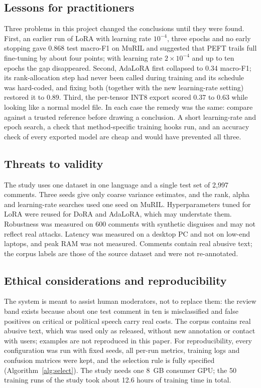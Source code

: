 \documentclass{svproc}
\begin{document}
\subsection{Lessons for practitioners}
Three problems in this project changed the conclusions until they were found. First, an earlier run of LoRA with learning rate $10^{-4}$, three epochs and no early stopping gave 0.868 test macro-F1 on MuRIL and suggested that PEFT trails full fine-tuning by about four points; with learning rate $2\times10^{-4}$ and up to ten epochs the gap disappeared. Second, AdaLoRA first collapsed to 0.34 macro-F1; its rank-allocation step had never been called during training and its schedule was hard-coded, and fixing both (together with the new learning-rate setting) restored it to 0.89. Third, the per-tensor INT8 export scored 0.37 to 0.63 while looking like a normal model file. In each case the remedy was the same: compare against a trusted reference before drawing a conclusion. A short learning-rate and epoch search, a check that method-specific training hooks run, and an accuracy check of every exported model are cheap and would have prevented all three.

\subsection{Threats to validity}
The study uses one dataset in one language and a single test set of 2,997 comments. Three seeds give only coarse variance estimates, and the rank, alpha and learning-rate searches used one seed on MuRIL. Hyperparameters tuned for LoRA were reused for DoRA and AdaLoRA, which may understate them. Robustness was measured on 600 comments with synthetic disguises and may not reflect real attacks. Latency was measured on a desktop PC and not on low-end laptops, and peak RAM was not measured. Comments contain real abusive text; the corpus labels are those of the source dataset and were not re-annotated.

\subsection{Ethical considerations and reproducibility}
The system is meant to assist human moderators, not to replace them: the review band exists because about one test comment in ten is misclassified and false positives on critical or political speech carry real costs. The corpus contains real abusive text, which was used only as released, without new annotation or contact with users; examples are not reproduced in this paper. For reproducibility, every configuration was run with fixed seeds, all per-run metrics, training logs and confusion matrices were kept, and the selection rule is fully specified (Algorithm~\ref{alg:select}). The study needs one 8~GB consumer GPU; the 50 training runs of the study took about 12.6 hours of training time in total.
\end{document}
